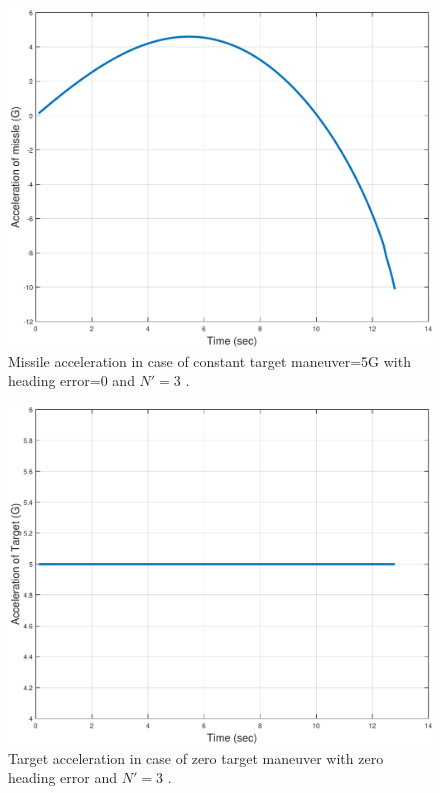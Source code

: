 \begin{figure}[htb]
	\centering
	\includegraphics[scale = 0.65]{fig/MissileAccelerationXNT5HE0N3.pdf}
	\caption{Missile acceleration in case of constant target maneuver=5G with heading error=0 and $N'=3$ .}
	\label{missile acceleration0NN3}
\end{figure}

\begin{figure}[H]
	\centering
	\includegraphics[scale = 0.65]{fig/TargetAccelerationXNT5HE0N3.pdf}
	\caption{Target acceleration in case of zero target maneuver with zero heading error and $N'=3$ .}
	\label{Target accelerationXNT5HE0N3}
\end{figure}



